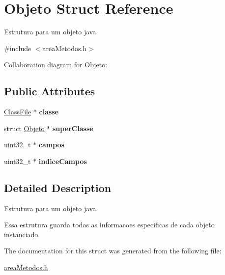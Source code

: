\hypertarget{structObjeto}{}\section{Objeto Struct Reference}
\label{structObjeto}


Estrutura para um objeto java.  




{\ttfamily \#include $<$area\+Metodos.\+h$>$}



Collaboration diagram for Objeto\+:
\subsection*{Public Attributes}
\begin{DoxyCompactItemize}
\item 
\mbox{\label{structObjeto_a5596a470c07ffff562f21911fc34fbf3}} 
\hyperlink{structClassFile}{Class\+File} $\ast$ {\bfseries classe}
\item 
\mbox{\label{structObjeto_aa7b097e2dea86e221a2c7fc1c85b6fe5}} 
struct \hyperlink{structObjeto}{Objeto} $\ast$ {\bfseries super\+Classe}
\item 
\mbox{\label{structObjeto_a744a42e5e611e1d2d2f65842f4117f7b}} 
uint32\+\_\+t $\ast$ {\bfseries campos}
\item 
\mbox{\label{structObjeto_a7561a3d822608137d47d2babf2dd9048}} 
uint32\+\_\+t $\ast$ {\bfseries indice\+Campos}
\end{DoxyCompactItemize}


\subsection{Detailed Description}
Estrutura para um objeto java. 

Essa estrutura guarda todas as informacoes especificas de cada objeto instanciado. 

The documentation for this struct was generated from the following file\+:\begin{DoxyCompactItemize}
\item 
\hyperlink{areaMetodos_8h}{area\+Metodos.\+h}\end{DoxyCompactItemize}
